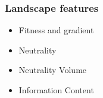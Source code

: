 \begin{frame}
	\frametitle{Landscape features}
	
	\begin{itemize}
		\item Fitness and gradient
		\item Neutrality
		\item Neutrality Volume
		\item Information Content
	\end{itemize}
	
\end{frame}